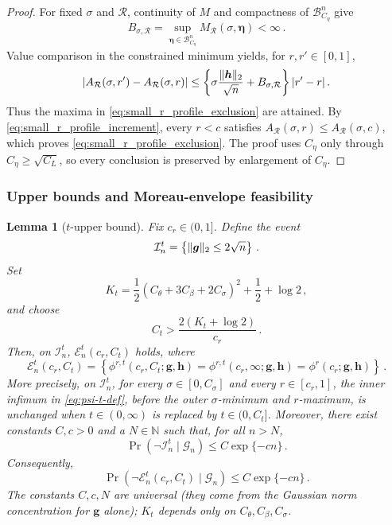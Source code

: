 \documentclass{article}
\makeatletter
\newtheorem{lemma}{Lemma}
\theoremstyle{definition}
\newcommand{\vnorm}[1]{%
	\ensuremath{%
		\if@display
		\left\| #1 \right\|
		\else
		\| #1 \|
		\fi
	}%
}
\newcommand{\abs}[1]{%
	\ensuremath{%
		\if@display
		\left| #1 \right|
		\else
		\lvert #1 \rvert
		\fi
	}%
}
\newcommand*{\bb}{\boldsymbol}
\def\bh{\bb{h}}
\def\bg{\bb{g}}
\makeatother
\begin{document}
\begin{bibunit}
\begin{proof}
For fixed $\sigma$ and $\mathcal R$, continuity of $M$ and compactness of
$\mathcal B^n_{C_\eta}$ give
$$
	B_{\sigma,\mathcal R}
	=
	\underset{\bb\eta\in\mathcal B^n_{C_\eta}}{\sup}
	M_{\mathcal R}(\sigma,\bb\eta)
	<
	\infty\,.
$$
Value comparison in the constrained minimum yields, for
$r,r'\in[0,1]$,
$$
	\abs{
		A_{\mathcal R}(\sigma,r')
		-
		A_{\mathcal R}(\sigma,r)
	}
	\leq
	\left\{
		\sigma\frac{\vnorm{\bh}_2}{\sqrt n}
		+
		B_{\sigma,\mathcal R}
	\right\}
	\abs{r'-r}\,.
$$
Thus the maxima in \eqref{eq:small_r_profile_exclusion} are attained. By
\eqref{eq:small_r_profile_increment}, every $r<c$ satisfies
$A_{\mathcal R}(\sigma,r)\leq A_{\mathcal R}(\sigma,c)$, which proves
\eqref{eq:small_r_profile_exclusion}. The proof uses $C_\eta$ only through
$C_\eta\geq\sqrt{C_L}$, so every conclusion is preserved by enlargement of
$C_\eta$.
\end{proof}

\subsubsection{Upper bounds and Moreau-envelope feasibility}


\begin{lemma}[$t$-upper bound]
	\label{lemma:t_ub}
	Fix $c_r\in(0,1]$. Define the event
	$$
		\mathcal I_n^t
		=
		\left\{
			\vnorm{\bg}_2\leq2\sqrt n
		\right\}\,.
	$$
	Set
	$$
		K_t
		=
		\frac12\left(C_\theta+3C_\beta+2C_\sigma\right)^2
		+
		\frac12
		+
		\log 2\,,
	$$
	and choose
	$$
		C_t
		>
		\frac{2(K_t+\log 2)}{c_r}\,.
	$$
	Then, on $\mathcal I_n^t$, $\mathcal E_n^t(c_r,C_t)$
	holds, where
	$$
		\mathcal E_n^t(c_r,C_t)
		=
		\left\{
			\phi^{r,t}(c_r,C_t;\bg,\bh)
			=
			\phi^{r,t}(c_r,\infty;\bg,\bh)
			=
			\phi^r(c_r;\bg,\bh)
		\right\}\,.
	$$
More precisely, on $\mathcal I_n^t$, for every
$\sigma\in[0,C_\sigma]$ and every $r\in[c_r,1]$, the inner infimum in
\eqref{eq:psi-t-def}, before the outer $\sigma$-minimum and $r$-maximum,
is unchanged when $t\in(0,\infty)$ is replaced by
$t\in(0,C_t]$.
	Moreover, there exist constants $C,c>0$ and a $N\in\mathbb N$ such that, for all $n>N$,
	$$
		\Pr\left(
			\lnot\mathcal I_n^t
			\mid
			\mathcal G_n
		\right)
		\leq
		C\exp\{-cn\}\,.
	$$
	Consequently,
	$$
		\Pr\left(
			\lnot\mathcal E_n^t(c_r,C_t)
			\mid
			\mathcal G_n
		\right)
		\leq
		C\exp\{-cn\}\,.
	$$
	The constants $C,c,N$ are universal (they come from the Gaussian norm concentration for $\bg$ alone); $K_t$ depends only on $C_\theta,C_\beta,C_\sigma$.
\end{lemma}


\end{bibunit}
\end{document}
